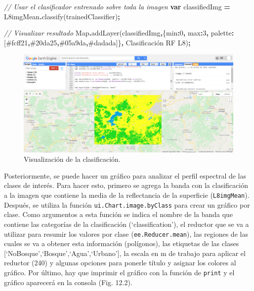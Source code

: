 \documentclass[
  12pt,
  letterpaper,
  twoside]{book}
\newenvironment{Shaded}{\begin{snugshade}}{\end{snugshade}}
\newcommand{\BuiltInTok}[1]{#1}
\newcommand{\CommentTok}[1]{\textcolor[rgb]{0.56,0.35,0.01}{\textit{#1}}}
\newcommand{\DataTypeTok}[1]{\textcolor[rgb]{0.13,0.29,0.53}{#1}}
\newcommand{\DecValTok}[1]{\textcolor[rgb]{0.00,0.00,0.81}{#1}}
\newcommand{\FunctionTok}[1]{\textcolor[rgb]{0.00,0.00,0.00}{#1}}
\newcommand{\KeywordTok}[1]{\textcolor[rgb]{0.13,0.29,0.53}{\textbf{#1}}}
\newcommand{\NormalTok}[1]{#1}
\newcommand{\OperatorTok}[1]{\textcolor[rgb]{0.81,0.36,0.00}{\textbf{#1}}}
\newcommand{\StringTok}[1]{\textcolor[rgb]{0.31,0.60,0.02}{#1}}
\begin{document}
\begin{Shaded}
\begin{Highlighting}[]
\CommentTok{// Usar el clasificador entrenado sobre toda la imagen}
\KeywordTok{var}\NormalTok{ classifiedImg }\OperatorTok{=}\NormalTok{ L8imgMean}\OperatorTok{.}\FunctionTok{classify}\NormalTok{(trainedClassifier)}\OperatorTok{;}

\CommentTok{// Visualizar resultado}
\BuiltInTok{Map}\OperatorTok{.}\FunctionTok{addLayer}\NormalTok{(classifiedImg}\OperatorTok{,}\NormalTok{\{}\DataTypeTok{min}\OperatorTok{:}\DecValTok{0}\OperatorTok{,} \DataTypeTok{max}\OperatorTok{:}\DecValTok{3}\OperatorTok{,} 
  \DataTypeTok{palette}\OperatorTok{:}\NormalTok{[}\StringTok{\textquotesingle{}\#fcff21\textquotesingle{}}\OperatorTok{,}\StringTok{\textquotesingle{}\#20da25\textquotesingle{}}\OperatorTok{,}\StringTok{\textquotesingle{}\#05a9da\textquotesingle{}}\OperatorTok{,}\StringTok{\textquotesingle{}\#dadada\textquotesingle{}}\NormalTok{]\}}\OperatorTok{,}
  \StringTok{\textquotesingle{}Clasificación RF L8\textquotesingle{}}\NormalTok{)}\OperatorTok{;}
\end{Highlighting}
\end{Shaded}

\begin{figure}[btp]

{\centering \includegraphics[width=1\linewidth]{Img/RFClass} 

}

\caption{Visualización de la clasificación.}\label{fig:unnamed-chunk-193}
\end{figure}

Posteriormente, se puede hacer un gráfico para analizar el perfil espectral de las clases de interés. Para hacer esto, primero se agrega la banda con la clasificación a la imagen que contiene la media de la reflectancia de la superficie (\texttt{L8imgMean}). Después, se utiliza la función \texttt{ui.Chart.image.byClass} para crear un gráfico por clase. Como argumentos a esta función se indica el nombre de la banda que contiene las categorías de la clasificación (`classification'), el reductor que se va a utilizar para resumir los valores por clase (\texttt{ee.Reducer.mean}), las regiones de las cuales se va a obtener esta información (polígonos), las etiquetas de las clases {[}`NoBosque',`Bosque',`Agua',`Urbano'{]}, la escala en m de trabajo para aplicar el reductor (240) y algunas opciones para ponerle título y asignar los colores al gráfico. Por último, hay que imprimir el gráfico con la función de \texttt{print} y el gráfico aparecerá en la consola (Fig. 12.2).
\end{document}
